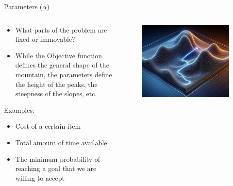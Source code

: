 \documentclass[10pt, aspectratio=169]{beamer}
\begin{document}
\begin{frame}{Parameters ($\overline{\alpha}$)}
    \begin{columns}
        \begin{column}{0.5\textwidth}
            \begin{itemize}
                \item What parts of the problem are fixed or immovable?
                \item While the Objective function defines the general shape of the mountain, the parameters define the height of the peaks, the steepness of the slopes, etc.
            \end{itemize}
            Examples:
            \begin{itemize}
                \item Cost of a certain item
                \item Total amount of time available
                \item The minimum probability of reaching a goal that we are willing to accept
            \end{itemize}
        \end{column}
        \begin{column}{0.5\textwidth}
            \begin{figure}
                \includegraphics[width=0.8\linewidth]{Mountain.jpeg}
            \end{figure}
        \end{column}
    \end{columns}
\end{frame}
\end{document}
